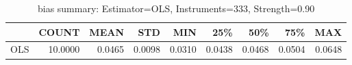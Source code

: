 \begin{table}[ht]
\centering
\caption{bias summary: Estimator=OLS, Instruments=333, Strength=0.90}
\begin{tabular}{lrrrrrrrr}
\toprule
 & COUNT & MEAN & STD & MIN & 25\% & 50\% & 75\% & MAX \\
\midrule
OLS & 10.0000 & 0.0465 & 0.0098 & 0.0310 & 0.0438 & 0.0468 & 0.0504 & 0.0648 \\
\bottomrule
\end{tabular}
\end{table}
